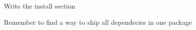 
\begin{DoxyRefList}
\item[\label{todo__todo000001}%
\hypertarget{todo__todo000001}{}%
page \hyperlink{index}{Cmd\+Messenger C++ Implementation} ]Write the install section 

Remember to find a way to ship all dependecies in one package 
\end{DoxyRefList}